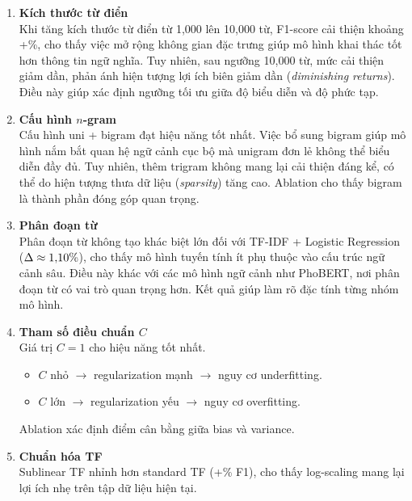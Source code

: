 \begin{enumerate}
    \item \textbf{Kích thước từ điển} \\
    Khi tăng kích thước từ điển từ 1{,}000 lên 10{,}000 từ, F1-score cải thiện khoảng +\ablvocdelta\%, cho thấy việc mở rộng không gian đặc trưng giúp mô hình khai thác tốt hơn thông tin ngữ nghĩa. Tuy nhiên, sau ngưỡng 10{,}000 từ, mức cải thiện giảm dần, phản ánh hiện tượng lợi ích biên giảm dần (\textit{diminishing returns}). Điều này giúp xác định ngưỡng tối ưu giữa độ biểu diễn và độ phức tạp.

    \item \textbf{Cấu hình $n$-gram} \\
    Cấu hình uni + bigram đạt hiệu năng tốt nhất. Việc bổ sung bigram giúp mô hình nắm bắt quan hệ ngữ cảnh cục bộ mà unigram đơn lẻ không thể biểu diễn đầy đủ. Tuy nhiên, thêm trigram không mang lại cải thiện đáng kể, có thể do hiện tượng thưa dữ liệu (\textit{sparsity}) tăng cao. Ablation cho thấy bigram là thành phần đóng góp quan trọng.

    \item \textbf{Phân đoạn từ} \\
    Phân đoạn từ không tạo khác biệt lớn đối với TF-IDF + Logistic Regression ($\Delta \approx 1{,}10\%$), cho thấy mô hình tuyến tính ít phụ thuộc vào cấu trúc ngữ cảnh sâu. Điều này khác với các mô hình ngữ cảnh như PhoBERT, nơi phân đoạn từ có vai trò quan trọng hơn. Kết quả giúp làm rõ đặc tính từng nhóm mô hình.

    \item \textbf{Tham số điều chuẩn $C$} \\
    Giá trị $C = 1$ cho hiệu năng tốt nhất.

    \begin{itemize}
        \item $C$ nhỏ $\rightarrow$ regularization mạnh $\rightarrow$ nguy cơ underfitting.
        \item $C$ lớn $\rightarrow$ regularization yếu $\rightarrow$ nguy cơ overfitting.
    \end{itemize}

    Ablation xác định điểm cân bằng giữa bias và variance.

    \item \textbf{Chuẩn hóa TF} \\
    Sublinear TF nhỉnh hơn standard TF (+\abltfdelta\% F1), cho thấy log-scaling mang lại lợi ích nhẹ trên tập dữ liệu hiện tại.
\end{enumerate}

